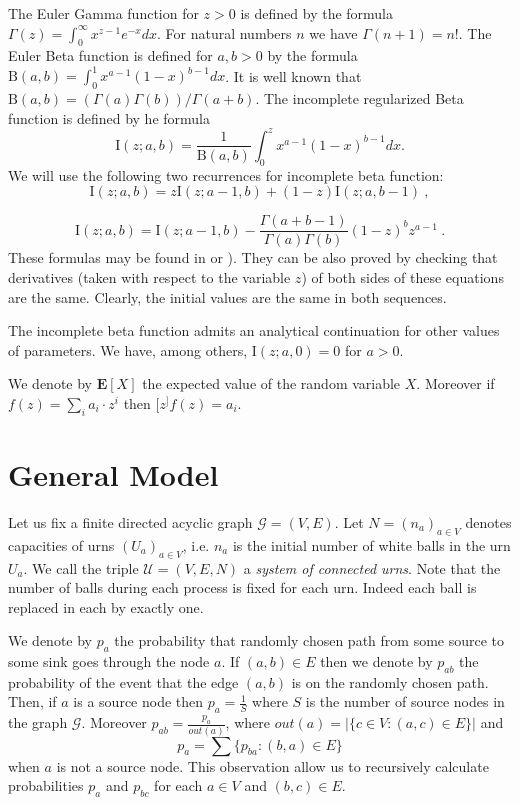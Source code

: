\documentclass[submission]{dmtcs}
\newcommand{\E}[1]{\mathbf{E}\left[#1\right]}
\newcommand{\Beta}[2]{\mathrm{B}(#1,#2)}
\newcommand{\IBETAREG}[3]{\mathrm{I}\left(#1;#2,#3\right)}
\begin{document}
The Euler Gamma function for $z>0$ is defined by the formula 
$\Gamma(z) = \int_{0}^{\infty} x^{z-1} e^{-x} dx$. For natural numbers $n$ we have
$\Gamma(n+1) = n!$. 
The Euler Beta function is defined for $a,b>0$ by the formula
$\Beta{a}{b} = \int_{0}^{1}x^{a-1}(1-x)^{b-1} dx$. It is well known that 
$\Beta{a}{b} = (\Gamma(a)\Gamma(b))/\Gamma(a+b)$.
The incomplete regularized Beta function is defined by he formula
$$
  \IBETAREG{z}{a}{b} = \frac{1}{\Beta{a}{b}} \int_{0}^{z} x^{a-1}(1-x)^{b-1} dx.
$$
We will use the following two recurrences for incomplete beta function:
\begin{equation}
  \label{icb:rec01}
  \IBETAREG{z}{a}{b} = z \IBETAREG{z}{a-1}{b} + (1-z) \IBETAREG{z}{a}{b-1} ~,
\end{equation}

\begin{equation}
  \label{icb:rec02}
  \IBETAREG{z}{a}{b} = 
  \IBETAREG{z}{a-1}{b} - \frac{\Gamma(a+b-1)}{\Gamma(a)\Gamma(b)} (1-z)^b z^{a-1}~. 
\end{equation}
These formulas may be found in \cite{WolframFS} or \cite{DLMF}). 
They can be also proved by checking that derivatives (taken with respect to the variable $z$)
of both sides of these equations are the same. Clearly, the initial values are the same in both 
sequences.

The incomplete beta function admits an analytical continuation for other values
of parameters. We have, among others, $\IBETAREG{z}{a}{0}=0$ for $a>0$.
 
We denote by $\E{X}$ the expected value of the random variable $X$. Moreover 
if $f(z) = \sum_{i} a_i \cdot z^i$ then $[z^]f(z) = a_i$.  

\section{General Model}\label{General}

Let us fix a finite directed acyclic graph  $\mathcal{G} = (V,E)$.
Let $N=(n_a)_{a\in V}$ denotes capacities of urns $(U_a)_{a\in V}$, 
i.e. $n_a$ is the initial number of white balls in the urn $U_a$.
We call the triple $\mathcal{U} = (V,E,N)$ 
a \textit{system of connected urns}. Note that the number of balls during each process is 
fixed for each urn. Indeed each ball is replaced in each by exactly one. 




We denote by $p_a$ the probability that randomly chosen path 
from some source to some sink goes through the node $a$. 
If $(a,b) \in E$ then 
we denote by $p_{ab}$ the probability of the event that the edge $(a,b)$ 
is on the randomly chosen path.
Then, if $a$ is a source node then $p_a = \frac{1}{S}$ where $S$ is the 
number of source nodes in the graph $\mathcal{G}$.  
Moreover $p_{ab} = \frac{p_a}{out(a)}$, where 
$out(a) = |\{c\in V: (a,c)\in E\}|$ and
$$
	p_a = \sum \{p_{ba}: (b,a)\in E\}
$$
when $a$ is not a source node. This observation allow us to recursively 
calculate probabilities $p_a$ and $p_{bc}$ for each $a\in V$ and 
$(b,c) \in E$.
\end{document}
